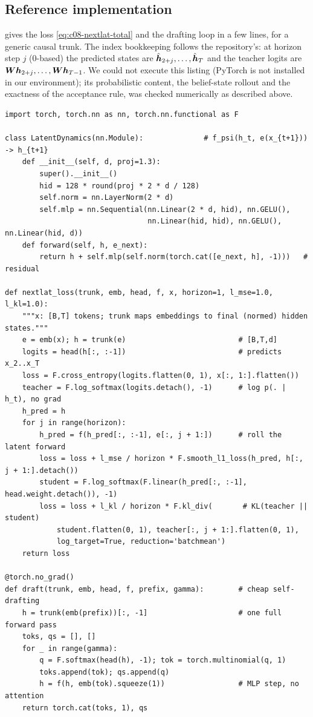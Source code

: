 \subsection{Reference implementation}

 gives the loss \eqref{eq:c08-nextlat-total} and the drafting loop in a
few lines, for a generic causal trunk. The index bookkeeping follows the repository's: at horizon
step $j$ (0-based) the predicted states are $\hat{\bm{h}}_{2+j},\dots,\hat{\bm{h}}_T$ and the teacher logits are
$\bm{W}\bm{h}_{2+j},\dots,\bm{W}\bm{h}_{T-1}$. We could not execute this listing (PyTorch is not installed in
our environment); its probabilistic content, the belief-state rollout and the exactness of the
acceptance rule, was checked numerically as described above.

\begin{lstlisting}[caption={Reference implementation (ours): the NextLat loss and latent drafting.},label={lst:c08-nextlat-ours}]
import torch, torch.nn as nn, torch.nn.functional as F

class LatentDynamics(nn.Module):              # f_psi(h_t, e(x_{t+1})) -> h_{t+1}
    def __init__(self, d, proj=1.3):
        super().__init__()
        hid = 128 * round(proj * 2 * d / 128)
        self.norm = nn.LayerNorm(2 * d)
        self.mlp = nn.Sequential(nn.Linear(2 * d, hid), nn.GELU(),
                                 nn.Linear(hid, hid), nn.GELU(), nn.Linear(hid, d))
    def forward(self, h, e_next):
        return h + self.mlp(self.norm(torch.cat([e_next, h], -1)))   # residual

def nextlat_loss(trunk, emb, head, f, x, horizon=1, l_mse=1.0, l_kl=1.0):
    """x: [B,T] tokens; trunk maps embeddings to final (normed) hidden states."""
    e = emb(x); h = trunk(e)                          # [B,T,d]
    logits = head(h[:, :-1])                          # predicts x_2..x_T
    loss = F.cross_entropy(logits.flatten(0, 1), x[:, 1:].flatten())
    teacher = F.log_softmax(logits.detach(), -1)      # log p(. | h_t), no grad
    h_pred = h
    for j in range(horizon):
        h_pred = f(h_pred[:, :-1], e[:, j + 1:])      # roll the latent forward
        loss = loss + l_mse / horizon * F.smooth_l1_loss(h_pred, h[:, j + 1:].detach())
        student = F.log_softmax(F.linear(h_pred[:, :-1], head.weight.detach()), -1)
        loss = loss + l_kl / horizon * F.kl_div(       # KL(teacher || student)
            student.flatten(0, 1), teacher[:, j + 1:].flatten(0, 1),
            log_target=True, reduction='batchmean')
    return loss

@torch.no_grad()
def draft(trunk, emb, head, f, prefix, gamma):        # cheap self-drafting
    h = trunk(emb(prefix))[:, -1]                     # one full forward pass
    toks, qs = [], []
    for _ in range(gamma):
        q = F.softmax(head(h), -1); tok = torch.multinomial(q, 1)
        toks.append(tok); qs.append(q)
        h = f(h, emb(tok).squeeze(1))                 # MLP step, no attention
    return torch.cat(toks, 1), qs
\end{lstlisting}


